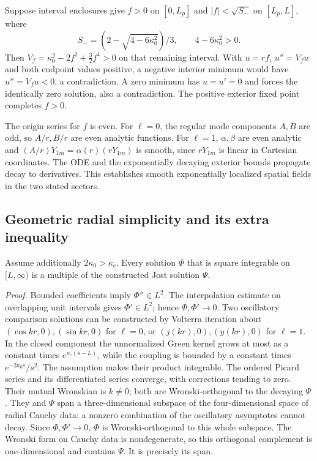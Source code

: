 Suppose interval enclosures give $f>0$ on $[0,L_p]$ and
$|f|<\sqrt{S_-}$ on $[L_p,L]$, where
\begin{equation}
 S_-=(2-\sqrt{4-6\kappa_0^2})/3,
 \qquad 4-6\kappa_0^2>0.
\end{equation}
Then $V_f=\kappa_0^2-2f^2+\tfrac32f^4>0$ on that remaining interval.
With $u=rf$, $u''=V_fu$ and both endpoint values positive, a negative
interior minimum would have $u''=V_fu<0$, a contradiction. A zero
minimum has $u=u'=0$ and forces the identically zero solution, also a
contradiction. The positive exterior fixed point completes $f>0$.

The origin series for $f$ is even. For $\ell=0$, the regular mode
components $A,B$ are odd, so $A/r,B/r$ are even analytic functions.
For $\ell=1$, $\alpha,\beta$ are even analytic and
$(A/r)Y_{1m}=\alpha(r)(rY_{1m})$ is smooth, since $rY_{1m}$ is linear
in Cartesian coordinates. The ODE and the exponentially decaying
exterior bounds propagate decay to derivatives. This establishes
smooth exponentially localized spatial fields in the two stated sectors.

\subsection{Geometric radial simplicity and its extra inequality}
\label{supp:simplicity}
Assume additionally $2\kappa_0>\kappa_c$. Every solution $\Phi$ that is
square integrable on $[L,\infty)$ is a multiple of the constructed
Jost solution $\Psi$.

\noindent\emph{Proof.}
Bounded coefficients imply $\Phi''\in L^2$. The interpolation estimate
on overlapping unit intervals gives $\Phi'\in L^2$; hence
$\Phi,\Phi'\to0$. Two oscillatory comparison solutions can be
constructed by Volterra iteration about $(\cos kr,0),(\sin kr,0)$
for $\ell=0$, or $(j(kr),0),(y(kr),0)$ for $\ell=1$.
In the closed component the unnormalized Green kernel grows at most
as a constant times $e^{\kappa_c(s-L)}$, while the coupling is bounded
by a constant times $e^{-2\kappa_0s}/s^2$. The assumption makes their
product integrable. The ordered Picard series and its differentiated
series converge, with corrections tending to zero. Their mutual
Wronskian is $k\ne0$; both are Wronski-orthogonal to the decaying
$\Psi$. They and $\Psi$ span a three-dimensional subspace of the
four-dimensional space of radial Cauchy data: a nonzero combination
of the oscillatory asymptotes cannot decay. Since $\Phi,\Phi'\to0$,
$\Phi$ is Wronski-orthogonal to this whole subspace. The Wronski form
on Cauchy data is nondegenerate, so this orthogonal complement is
one-dimensional and contains $\Psi$. It is precisely its span.

